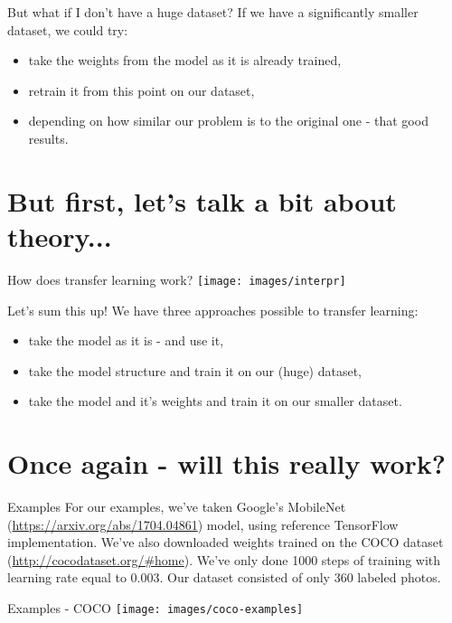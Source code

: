 \documentclass[aspectratio=1610,english]{beamer} %
\begin{document}
 	\begin{frame}{But what if I don't have a huge dataset?}
 		If we have a significantly smaller dataset, we could try:
 		\begin{itemize}
		 	\item take the weights from the model as it is already trained,
		 	\item retrain it from this point on our dataset,
		 	\item depending on how similar our problem is to the original one - that good results.
		 \end{itemize}
	\end{frame}

\section{But first, let's talk a bit about theory...}
  	\begin{frame}{How does transfer learning work?}
			 \texttt{[image: images/interpr]}
	 \end{frame}
  	\begin{frame}{Let's sum this up!}
		We have three approaches possible to transfer learning:
		 \begin{itemize}
		 	\item take the model as it is - and use it,
		 	\item take the model structure and train it on our (huge) dataset,
		 	\item take the model and it's weights and train it on our smaller dataset.
		 \end{itemize}
	\end{frame}
 \section{Once again - will this really work?}
  	\begin{frame}{Examples}
		For our examples, we've taken Google's MobileNet (\url{https://arxiv.org/abs/1704.04861}) model, using reference TensorFlow implementation. We've also downloaded weights trained on the COCO dataset (\url{http://cocodataset.org/\#home}).
		We've only done 1000 steps of training with learning rate equal to 0.003.
		Our dataset consisted of only 360 labeled photos.
	\end{frame}
	\begin{frame}{Examples - COCO}
		\texttt{[image: images/coco-examples]}
	\end{frame}
\end{document}
